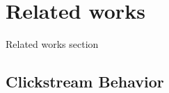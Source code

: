 \section{Related works}
\label{ch:relate}

Related works section



\subsection{Clickstream Behavior}






